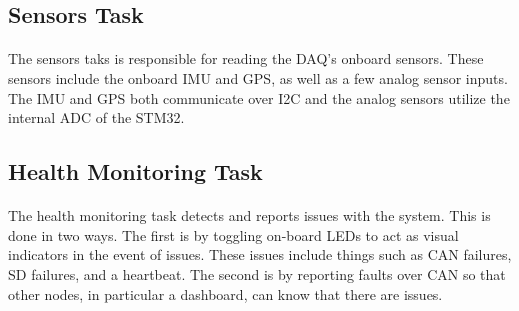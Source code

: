 \subsection{Sensors Task}

\paragraph{}
The sensors taks is responsible for reading the DAQ's onboard sensors.
These sensors include the onboard IMU and GPS, as well as a few analog sensor inputs.
The IMU and GPS both communicate over I2C and the analog sensors utilize the internal ADC of the STM32.


\subsection{Health Monitoring Task}

\paragraph{}
The health monitoring task detects and reports issues with the system.
This is done in two ways.
The first is by toggling on-board LEDs to act as visual indicators in the event of issues.
These issues include things such as CAN failures, SD failures, and a heartbeat.
The second is by reporting faults over CAN so that other nodes, in particular a dashboard, can know that there are issues.
